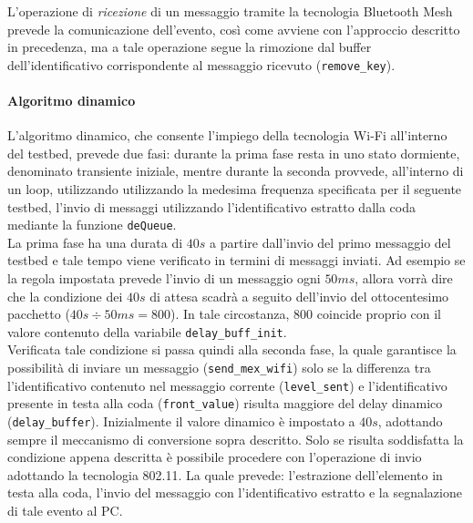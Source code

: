 \noindent L'operazione di \textit{ricezione} di un messaggio tramite la tecnologia Bluetooth Mesh prevede la comunicazione dell'evento, così come avviene con l'approccio descritto in precedenza, ma a tale operazione segue la rimozione dal buffer dell'identificativo corrispondente al messaggio ricevuto (\texttt{remove\_key}).

\paragraph{Algoritmo dinamico} 
L'algoritmo dinamico, che consente l'impiego della tecnologia Wi-Fi all'interno del testbed, prevede due fasi: durante la prima fase resta in uno stato dormiente, denominato transiente iniziale, mentre durante la seconda provvede, all'interno di un loop, utilizzando utilizzando la medesima frequenza specificata per il seguente testbed, l'invio di messaggi utilizzando l'identificativo estratto dalla coda mediante la funzione \texttt{deQueue}.\\
La prima fase ha una durata di $40 s$ a partire dall'invio del primo messaggio del testbed e tale tempo viene verificato in termini di messaggi inviati. Ad esempio se la regola impostata prevede l'invio di un messaggio ogni $50 ms$, allora vorrà dire che la condizione dei $40 s$ di attesa scadrà a seguito dell'invio del ottocentesimo pacchetto ($40 s\div 50 ms = 800$). In tale circostanza, $800$ coincide proprio con il valore contenuto della variabile \texttt{delay\_buff\_init}.\\
Verificata tale condizione si passa quindi alla seconda fase, la quale garantisce la possibilità di inviare un messaggio (\texttt{send\_mex\_wifi}) solo se la differenza tra l'identificativo contenuto nel messaggio corrente (\texttt{level\_sent}) e l'identificativo presente in testa alla coda (\texttt{front\_value}) risulta maggiore del delay dinamico (\texttt{delay\_buffer}). Inizialmente il valore dinamico è impostato a $40 s$, adottando sempre il meccanismo di conversione sopra descritto. Solo se risulta soddisfatta la condizione appena descritta è possibile procedere con l'operazione di invio adottando la tecnologia 802.11. La quale prevede: l'estrazione dell'elemento in testa alla coda, l'invio del messaggio con l'identificativo estratto e la segnalazione di tale evento al PC.\\

